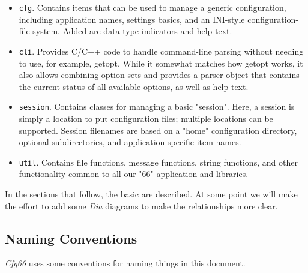 \documentclass[
 11pt,
 twoside,
 a4paper,
 final                                 %
]{article}
\begin{document}
   \begin{itemize}
      \item \texttt{cfg}.
         Contains items that can be used to manage a generic
         configuration, including application names, settings basics,
         and an INI-style configuration-file system. Added are
         data-type indicators and help text.
      \item \texttt{cli}.
         Provides C/C++ code to handle command-line parsing without
         needing to use, for example, getopt. While it somewhat matches
         how getopt works, it also allows combining option sets and
         provides a parser object that contains the current status
         of all available options, as well as help text.
      \item \texttt{session}.
         Contains classes for managing a basic "session". Here, a
         session is simply a location to put configuration files;
         multiple locations can be supported. Session filenames are
         based on a "home" configuration directory, optional
         subdirectories, and application-specific item names.
      \item \texttt{util}.
         Contains file functions, message functions, string functions,
         and other functionality common to all our "66" application
         and libraries.
   \end{itemize}

   In the sections that follow, the basic are described.
   At some point we will make the effort to add some \textsl{Dia}
   diagrams to make the relationships more clear.

\subsection{Naming Conventions}
\label{subsec:introduction_conventions}

   \textsl{Cfg66} uses some conventions for naming things in this
   document.
\end{document}
